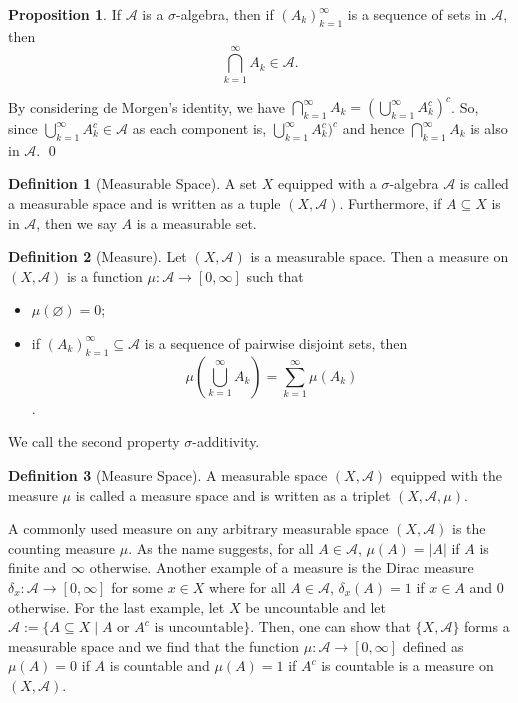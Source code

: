 \documentclass[
]{article}
\theoremstyle{definition}
\newtheorem{prop}{Proposition}
\theoremstyle{definition}
\newtheorem{definition}{Definition}[section]
\begin{document}
\begin{prop}
  If \(\mathcal{A}\) is a \(\sigma\)-algebra, then if \((A_k)_{k = 1}^\infty\) is 
  a sequence of sets in \(\mathcal{A}\), then 
  \[\bigcap_{k = 1}^\infty A_k \in \mathcal{A}.\]
\end{prop}
\proof

By considering de Morgen's identity, we have
\(\bigcap_{k = 1}^\infty A_k =  (\bigcup_{k = 1}^\infty A_k^c)^c\). So,
since \(\bigcup_{k = 1}^\infty A_k^c \in  \mathcal{A}\) as each
component is, \(\bigcup_{k = 1}^\infty A_k^c)^c\) and hence
\(\bigcap_{k = 1}^\infty A_k\) is also in \(\mathcal{A}\). \qed

\begin{definition}[Measurable Space]
  A set \(X\) equipped with a \(\sigma\)-algebra \(\mathcal{A}\) is called a 
  measurable space and is written as a tuple \((X, \mathcal{A})\). Furthermore, 
  if \(A \subseteq X\) is in \(\mathcal{A}\), then we say \(A\) is a measurable 
  set.
\end{definition}

\begin{definition}[Measure]
  Let \((X, \mathcal{A})\) is a measurable space. Then a measure on \((X, \mathcal{A})\) 
  is a function \(\mu : \mathcal{A} \to [0, \infty]\) such that 
  \begin{itemize}
    \item \(\mu(\varnothing) = 0\);
    \item if \((A_k)_{k = 1}^\infty \subseteq \mathcal{A}\) is a sequence of 
      pairwise disjoint sets, then 
      \[\mu\left(\bigcup_{k = 1}^\infty A_k\right) = \sum_{k = 1}^\infty \mu(A_k)\].
  \end{itemize}
  We call the second property \(\sigma\)-additivity. 
\end{definition}

\begin{definition}[Measure Space]
  A measurable space \((X, \mathcal{A})\) equipped with the measure \(\mu\) is 
  called a measure space and is written as a triplet \((X, \mathcal{A}, \mu)\).
\end{definition}

A commonly used measure on any arbitrary measurable space
\((X, \mathcal{A})\) is the counting measure \(\mu\). As the name
suggests, for all \(A \in \mathcal{A}\), \(\mu(A) = |A|\) if \(A\) is
finite and \(\infty\) otherwise. Another example of a measure is the
Dirac measure \(\delta_x : \mathcal{A} \to [0, \infty]\) for some
\(x \in X\) where for all \(A \in \mathcal{A}\), \(\delta_x(A) = 1\) if
\(x \in A\) and 0 otherwise. For the last example, let \(X\) be
uncountable and let
\(\mathcal{A} := \{A \subseteq X \mid A \text{ or } A^c \text{ is uncountable}\}\).
Then, one can show that \(\{X, \mathcal{A}\}\) forms a measurable space
and we find that the function \(\mu : \mathcal{A} \to [0, \infty]\)
defined as \(\mu(A) = 0\) if \(A\) is countable and \(\mu(A) = 1\) if
\(A^c\) is countable is a measure on \((X, \mathcal{A})\).
\end{document}
